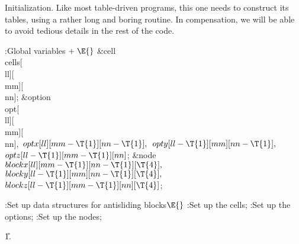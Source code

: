 Initialization. Like most table-driven programs, this
one needs to
construct its tables, using a rather long and boring routine. In compensation,
we will be able to avoid tedious details in the rest of the code.

\Y\B\4:Global variables\X${}\mathrel+\E{}$\6
\&{cell} \\{cells}[\\{ll}][\\{mm}][\\{nn}];\6
\&{option} \\{opt}[\\{ll}][\\{mm}][\\{nn}]${},{}$ ${}\\{optx}[\\{ll}][\\{mm}-%
\T{1}][\\{nn}-\T{1}],{}$ ${}\\{opty}[\\{ll}-\T{1}][\\{mm}][\\{nn}-\T{1}],{}$
${}\\{optz}[\\{ll}-\T{1}][\\{mm}-\T{1}][\\{nn}]{}$;\6
\&{node} ${}\\{blockx}[\\{ll}][\\{mm}-\T{1}][\\{nn}-\T{1}][\T{4}],{}$ ${}%
\\{blocky}[\\{ll}-\T{1}][\\{mm}][\\{nn}-\T{1}][\T{4}],{}$ ${}\\{blockz}[\\{ll}-%
\T{1}][\\{mm}-\T{1}][\\{nn}][\T{4}]{}$;\par
\fi

\B{}:Set up data structures for antisliding blocks\X${}%
\E{}$\6
:Set up the cells\X;\6
:Set up the options\X;\6
:Set up the nodes\X;\par
\U1.\fi

